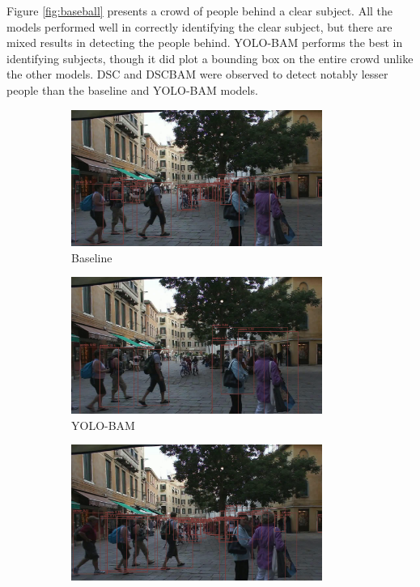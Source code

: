 Figure \ref{fig:baseball} presents a crowd of people behind a clear subject. All the models performed well in correctly identifying the clear subject, but there are mixed results in detecting the people behind. YOLO-BAM performs the best in identifying subjects, though it did plot a bounding box on the entire crowd unlike the other models. DSC and DSCBAM were observed to detect notably lesser people than the baseline and YOLO-BAM models.



\begin{figure}[!htbp]
\centering
\begin{subfigure}{.25\textwidth}
  \centering
  \includegraphics[width=0.9\textwidth]{images/base_MOT-02.png}
  \caption{Baseline}
  \label{fig:baseMOT-02}
\end{subfigure}%
\begin{subfigure}{.25\textwidth}
  \centering
  \includegraphics[width=0.9\textwidth]{images/CBAM_MOT-02.png}
  \caption{YOLO-BAM}
  \label{fig:cbamMOT-02}
\end{subfigure}%
\begin{subfigure}{.25\textwidth}
  \centering
  \includegraphics[width=0.9\textwidth]{images/DSC_MOT-02.png}

\end{subfigure}
\end{figure}
